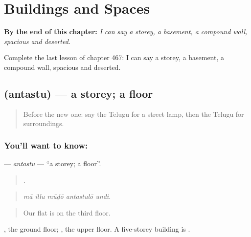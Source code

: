 
\chapter{Buildings and Spaces}
\label{ch:te-buildings-and-spaces}

\begin{chapteropening}
\textbf{By the end of this chapter:} \emph{I can say a storey, a basement, a compound wall, spacious and deserted.}

Complete the last lesson of chapter 467: I can say a storey, a basement, a compound wall, spacious and deserted.
\end{chapteropening}

\section[\texorpdfstring{\te{అంతస్తు} (antastu)}{అంతస్తు (antastu)}]{ (antastu) — a storey; a floor}

\label{lesson:TE-C467-antastu}



\begin{quote}
Before the new one: say the Telugu for a street lamp, then the Telugu for surroundings.
\end{quote}

\subsection*{You'll want to know: }
\textbf{} — \emph{antastu} — \textquotedblleft{}a storey; a floor\textquotedblright{}.

\begin{quote}
    .
\end{quote}

\begin{quote}
\emph{mā illu mūḍō antastulō undi.}
\end{quote}

\begin{quote}
Our flat is on the third floor.
\end{quote}

 , the ground floor;  , the upper floor. A five-storey building is   .

